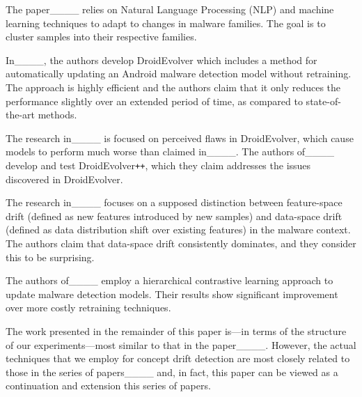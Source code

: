 The paper____ relies on Natural Language Processing (NLP)
and machine learning techniques to adapt to changes in malware families. 
The goal is to cluster samples into their respective families.

In____, the authors develop DroidEvolver which includes a method 
for automatically updating an Android malware
detection model without retraining. The approach is highly efficient 
and the authors claim that it only reduces the performance
slightly over an extended period of time, as compared to state-of-the-art methods.

The research in____ is focused on perceived flaws in DroidEvolver, which cause models
to perform much worse than claimed in____. The authors of____ develop and test
DroidEvolver\texttt{++}, which they claim addresses the issues discovered in DroidEvolver.

The research in____ focuses on a supposed distinction between 
feature-space drift (defined as new features introduced by new 
samples) and data-space drift (defined as data distribution 
shift over existing features) in the malware context. The authors 
claim that data-space drift consistently dominates, and they consider
this to be surprising.

The authors of____ employ a hierarchical contrastive learning approach to update 
malware detection models. Their results show significant improvement over more costly 
retraining techniques.

The work presented in the remainder of this paper
is---in terms of the structure of our experiments---most similar to that in the paper____.
However, the actual techniques that we employ for concept drift detection are 
most closely related to those in the series of papers____
and, in fact, this paper can be viewed as a continuation and extension this series of papers.